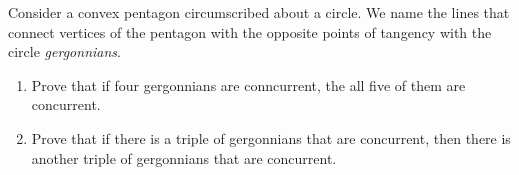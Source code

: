 Consider a convex pentagon circumscribed about a circle. We name the lines that connect vertices of the pentagon with the opposite points of tangency with the circle \emph{gergonnians}.
\begin{enumerate}[label=(\alph*)]
	\item Prove that if four gergonnians are conncurrent, the all five of them are concurrent.
	\item Prove that if there is a triple of gergonnians that are concurrent, then there is another triple of gergonnians that are concurrent.
\end{enumerate}